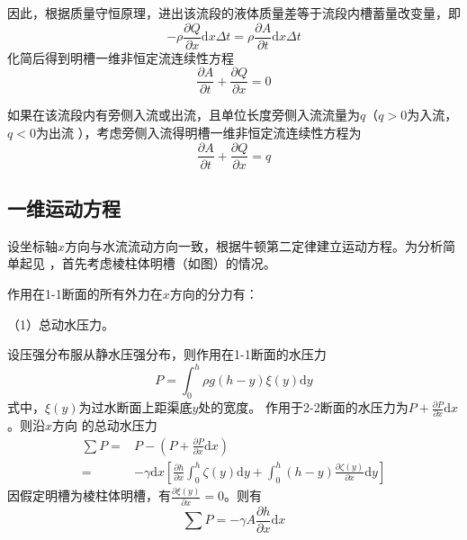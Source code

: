 因此，根据质量守恒原理，进出该流段的液体质量差等于流段内槽蓄量改变量，即
\begin{equation*}
  -\rho\frac{\partial Q}{\partial x}\mathrm{d}x\Delta t
  =
  \rho\frac{\partial A}{\partial t}\mathrm{d}x\Delta t
\end{equation*}
化简后得到明槽一维非恒定流连续性方程
\begin{equation}
  \frac{\partial A}{\partial t}
  +
  \frac{\partial Q}{\partial x}
  =
  0
  \label{EqCGe_SVe_Ce}
\end{equation}

如果在该流段内有旁侧入流或出流，且单位长度旁侧入流流量为$q$（$q>0$为入流，$q<0$为出流
），考虑旁侧入流得明槽一维非恒定流连续性方程为
\begin{equation}
\frac{\partial A}{\partial t}
+
\frac{\partial Q}{\partial x}
=
q
\end{equation}

\subsection{一维运动方程}
设坐标轴$x$方向与水流流动方向一致，根据牛顿第二定律建立运动方程。为分析简单起见
，首先考虑棱柱体明槽（如图）的情况。

作用在1-1断面的所有外力在$x$方向的分力有：

（1）总动水压力。

设压强分布服从静水压强分布，则作用在1-1断面的水压力
\begin{equation}
P
=
\int_{0}^{h}\! \rho g(h-y)\xi(y)\mathrm{d}y
\end{equation}
式中，$\xi(y)$为过水断面上距渠底$y$处的宽度。
作用于2-2断面的水压力为$P+\frac{\partial P}{\partial x}\mathrm{d}x$。则沿$x$方向
的总动水压力
\begin{equation}
  \begin{aligned}
    \sum P
    =&
    P - \left(P+\frac {\partial P} {\partial x}\mathrm{d}x\right)
    \\
    =&
    -\gamma \mathrm{d}x 
    \left[
      \frac{\partial h}{\partial x}
      \int_{0}^{h}\!
      \zeta(y)
      \mathrm{d}y
      +
      \int_{0}^{h}\!
      (h-y)
      \frac{\partial \zeta(y)}{\partial x}
      \mathrm{d}y
    \right]
  \end{aligned}
  \label{EqCGe_SVe_Me_Pressure}
\end{equation}
因假定明槽为棱柱体明槽，有$\frac{\partial \xi(y)}{\partial x}=0$。则有
\begin{equation}
\sum P
=
-\gamma A\frac{\partial h}{\partial x}\mathrm{d}x
\end{equation}

